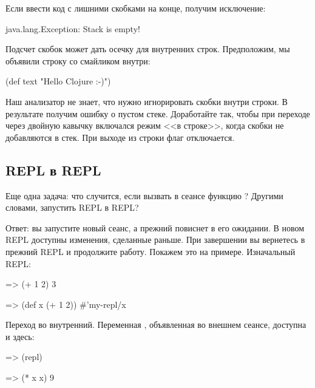Если ввести код с лишними скобками на конце, получим исключение:

\begin{english}
  \begin{text}
java.lang.Exception: Stack is empty!
  \end{text}
\end{english}

Подсчет скобок может дать осечку для внутренних строк. Предположим, мы объявили строку со смайликом внутри:

\begin{english}
  \begin{clojure}
(def text "Hello Clojure :-)")
  \end{clojure}
\end{english}

Наш анализатор не знает, что нужно игнорировать скобки внутри строки. В результате получим ошибку о пустом стеке. Доработайте  так, чтобы при переходе через двойную кавычку включался режим <<в строке>>, когда скобки не добавляются в стек. При выходе из строки флаг отключается.

\subsection{REPL в REPL}

Еще одна задача: что случится, если вызвать в сеансе функцию ? Другими словами, запустить REPL в REPL?

Ответ: вы запустите новый сеанс, а прежний повиснет в его ожидании. В новом REPL доступны изменения, сделанные раньше. При завершении вы вернетесь в прежний REPL и продолжите работу. Покажем это на примере. Изначальный REPL:

\begin{english}
  \begin{clojure/lines}
=> (+ 1 2)
3

=> (def x (+ 1 2))
#'my-repl/x
  \end{clojure/lines}
\end{english}

\pagebreaklarge

Переход во внутренний. Переменная , объявленная во внешнем сеансе, доступна и здесь:

\begin{english}
  \begin{clojure}
=> (repl)

=> (* x x)
9
  \end{clojure}
\end{english}

